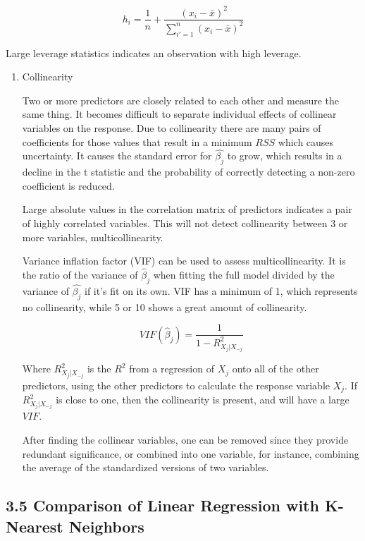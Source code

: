\documentclass[
]{article}
\begin{document}
\[h_i = \frac{1}{n} + \frac{(x_i - \bar{x})^2}{\sum^n_{i'=1}(x_i-\bar{x})^2}\]

Large leverage statistics indicates an observation with high leverage.

\begin{enumerate}
\def\labelenumi{\arabic{enumi}.}
\item
  Collinearity

  Two or more predictors are closely related to each other and measure
  the same thing. It becomes difficult to separate individual effects of
  collinear variables on the response. Due to collinearity there are
  many pairs of coefficients for those values that result in a minimum
  \(RSS\) which causes uncertainty. It causes the standard error for
  \(\hat{\beta_j}\) to grow, which results in a decline in the t
  statistic and the probability of correctly detecting a non-zero
  coefficient is reduced.

  Large absolute values in the correlation matrix of predictors
  indicates a pair of highly correlated variables. This will not detect
  collinearity between 3 or more variables, multicollinearity.

  Variance inflation factor (VIF) can be used to assess
  multicollinearity. It is the ratio of the variance of
  \(\hat{\beta}_j\) when fitting the full model divided by the variance
  of \(\hat{\beta_j}\) if it's fit on its own. VIF has a minimum of 1,
  which represents no collinearity, while 5 or 10 shows a great amount
  of collinearity.

  \[VIF(\hat{\beta}_j) = \frac{1}{1-R^2_{X_j|X_{-j}}}\]

  Where \(R^2_{X_j|X_{-j}}\) is the \(R^2\) from a regression of \(X_j\)
  onto all of the other predictors, using the other predictors to
  calculate the response variable \(X_j\). If \(R^2_{X_j|X_{-j}}\) is
  close to one, then the collinearity is present, and will have a large
  \(VIF\).

  After finding the collinear variables, one can be removed since they
  provide redundant significance, or combined into one variable, for
  instance, combining the average of the standardized versions of two
  variables.
\end{enumerate}

\hypertarget{header-n131}{%
\subsection{3.5 Comparison of Linear Regression with K-Nearest
Neighbors}\label{header-n131}}
\end{document}
